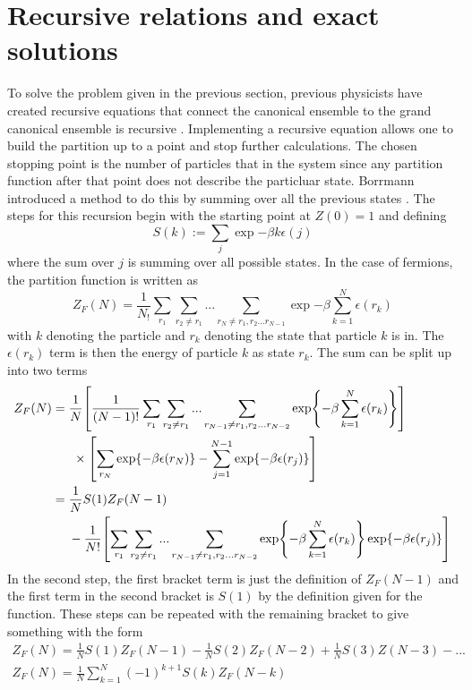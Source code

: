 \section{Recursive relations and exact solutions}
To solve the problem given in the previous section, previous physicists have created recursive equations that connect the canonical ensemble to the grand canonical ensemble is recursive \cite{Hatem2020} \cite{Borr1993} \cite{Schon1996}. Implementing a recursive equation allows one to build the partition up to a point and stop further calculations. The chosen stopping point is the number of particles that in the system since any partition function after that point does not describe the particluar state. Borrmann introduced a method to do this by summing over all the previous states \cite{Borr1993}. The steps for this recursion begin with the starting point at $Z(0)=1$ and defining 
\begin{equation}
    S(k):=\sum_j \exp{-\beta k \epsilon(j)}
\end{equation}
where the sum over $j$ is summing over all possible states. In the case of fermions, the partition function is written as
\begin{equation}
    Z_F(N)=\frac{1}{N_!}\sum_{r_1}\sum_{r_2\neq r_1}...\sum_{r_N\neq r_1,r_2...r_{N-1}} \exp{-\beta \sum_{k=1}^N \epsilon(r_k)}
\end{equation}
with $k$ denoting the particle and $r_k$ denoting the state that particle $k$ is in. The $\epsilon(r_k)$ term is then the energy of particle $k$ as state $r_k$. The sum can be split up into two terms
\begin{align}
    Z_F(N)&=\frac{1}{N}\qty[\frac{1}{(N-1)!} \sum_{r_1}\sum_{r_2\neq r_1}...\sum_{r_{N-1}\neq r_1,r_2...r_{N-2}} \exp{-\beta \sum_{k=1}^N \epsilon(r_k)}] \nonumber\\&\ \ \ \ \ \times \qty[\sum_{r_N}\exp{-\beta\epsilon(r_N)}-\sum_{j=1}^{N-1}\exp{-\beta\epsilon(r_j)}]\nonumber \\
   &=\frac{1}{N}S(1)Z_F(N-1)\\
   &\ \ \ \ -\frac{1}{N!}\qty[\sum_{r_1}\sum_{r_2\neq r_1}...\sum_{r_{N-1}\neq r_1,r_2...r_{N-2}} \exp{-\beta \sum_{k=1}^N \epsilon(r_k)} \exp{-\beta \epsilon(r_j)}] \nonumber
\end{align}
In the second step, the first bracket term is just the definition of $Z_F(N-1)$ and the first term in the second bracket is $S(1)$ by the definition given for the function. These steps can be repeated with the remaining bracket to give something with the form \cite{Borr1993}
\begin{gather}
    Z_F(N)=\frac{1}{N}S(1)Z_F(N-1)-\frac{1}{N}S(2)Z_F(N-2)+\frac{1}{N}S(3)Z(N-3)-...\nonumber\\
    Z_F(N)=\frac{1}{N}\sum_{k=1}^N (-1)^{k+1} S(k)Z_F(N-k)
\end{gather}

